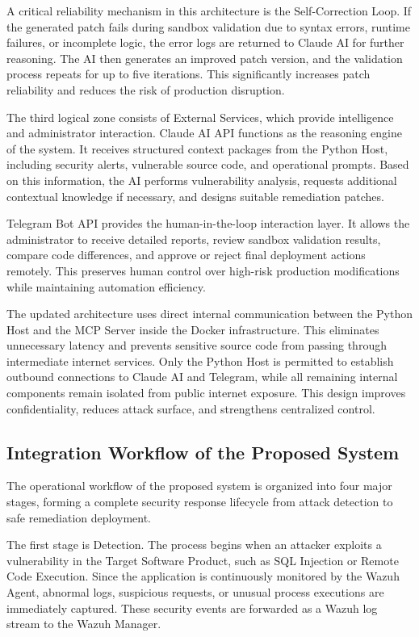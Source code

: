 \documentclass[12pt]{report}
\begin{document}
A critical reliability mechanism in this architecture is the Self-Correction Loop. If the generated patch fails during sandbox validation due to syntax errors, runtime failures, or incomplete logic, the error logs are returned to Claude AI for further reasoning. The AI then generates an improved patch version, and the validation process repeats for up to five iterations. This significantly increases patch reliability and reduces the risk of production disruption.

The third logical zone consists of External Services, which provide intelligence and administrator interaction. Claude AI API functions as the reasoning engine of the system. It receives structured context packages from the Python Host, including security alerts, vulnerable source code, and operational prompts. Based on this information, the AI performs vulnerability analysis, requests additional contextual knowledge if necessary, and designs suitable remediation patches.

Telegram Bot API provides the human-in-the-loop interaction layer. It allows the administrator to receive detailed reports, review sandbox validation results, compare code differences, and approve or reject final deployment actions remotely. This preserves human control over high-risk production modifications while maintaining automation efficiency.

The updated architecture uses direct internal communication between the Python Host and the MCP Server inside the Docker infrastructure. This eliminates unnecessary latency and prevents sensitive source code from passing through intermediate internet services. Only the Python Host is permitted to establish outbound connections to Claude AI and Telegram, while all remaining internal components remain isolated from public internet exposure. This design improves confidentiality, reduces attack surface, and strengthens centralized control.

\subsection{Integration Workflow of the Proposed System}

The operational workflow of the proposed system is organized into four major stages, forming a complete security response lifecycle from attack detection to safe remediation deployment.

The first stage is Detection. The process begins when an attacker exploits a vulnerability in the Target Software Product, such as SQL Injection or Remote Code Execution. Since the application is continuously monitored by the Wazuh Agent, abnormal logs, suspicious requests, or unusual process executions are immediately captured. These security events are forwarded as a Wazuh log stream to the Wazuh Manager.
\end{document}

